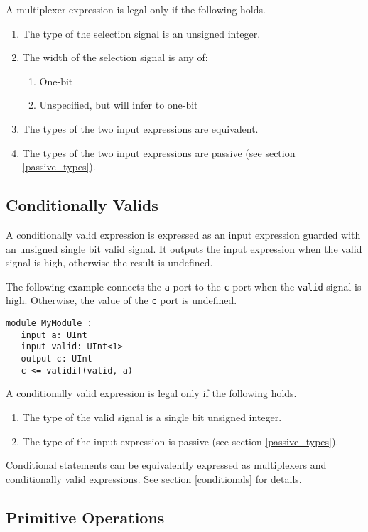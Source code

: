 \documentclass[12pt]{article}
\begin{document}
A multiplexer expression is legal only if the following holds.
\begin{enumerate}
\item The type of the selection signal is an unsigned integer.
\item The width of the selection signal is any of:
  \begin{enumerate}
  \item One-bit
  \item Unspecified, but will infer to one-bit
  \end{enumerate}
\item The types of the two input expressions are equivalent.
\item The types of the two input expressions are passive (see section \ref{passive_types}).
\end{enumerate}

\subsection{Conditionally Valids} \label{conditionally_valids}

A conditionally valid expression is expressed as an input expression guarded with an unsigned single bit valid signal. It outputs the input expression when the valid signal is high, otherwise the result is undefined.

The following example connects the \verb|a| port to the \verb|c| port when the \verb|valid| signal is high. Otherwise, the value of the \verb|c| port is undefined.
\begin{lstlisting}
module MyModule :
   input a: UInt
   input valid: UInt<1>
   output c: UInt
   c <= validif(valid, a)
\end{lstlisting}

A conditionally valid expression is legal only if the following holds.
\begin{enumerate}
\item The type of the valid signal is a single bit unsigned integer.
\item The type of the input expression is passive (see section \ref{passive_types}).
\end{enumerate}

Conditional statements can be equivalently expressed as multiplexers and conditionally valid expressions. See section \ref{conditionals} for details.

\subsection{Primitive Operations}
\end{document}
